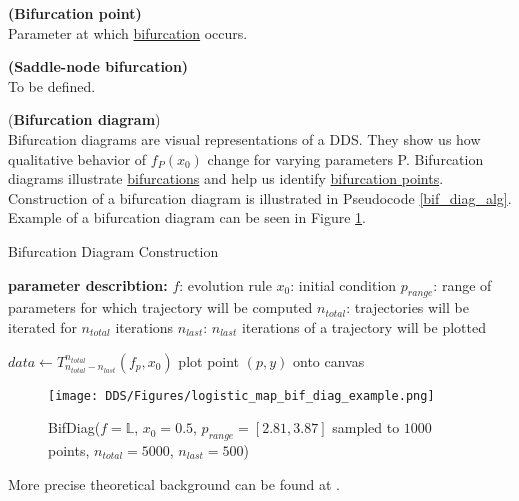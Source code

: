 \begin{definition} \textbf{(Bifurcation point)} \\
    \label{def:bifurcation_point}
    Parameter at which \hyperref[def:bifurcation]{bifurcation} occurs.
\end{definition}

\begin{definition} \textbf{(Saddle-node bifurcation)} \\
    \label{def:saddle_node_bif}
    To be defined.
\end{definition}


\begin{remark} (\textbf{Bifurcation diagram}) \label{def: bif_diag} \\
    Bifurcation diagrams are visual representations of a DDS.
    They show us how qualitative behavior of $f_P(x_0)$ change for varying parameters P.
    Bifurcation diagrams illustrate \hyperref[def:bifurcation]{bifurcations} and help us identify \hyperref[def:bifurcation_point]{bifurcation points}.
    Construction of a bifurcation diagram is illustrated in Pseudocode \ref{bif_diag_alg}.
    Example of a bifurcation diagram can be seen in Figure \ref{fig:bif_diag_example}.
\end{remark}

\begin{algorithm}
\caption{Bifurcation Diagram Construction}\label{bif_diag_alg}
\begin{algorithmic}[1]
\Statex \textbf{parameter describtion:}
\Statex $f$: evolution rule
\Statex $x_0$: initial condition
\Statex $p_{range}$: range of parameters for which trajectory will be computed
\Statex $n_{total}$: trajectories will be iterated for $n_{total}$ iterations
\Statex $n_{last}$: $n_{last}$ iterations of a trajectory will be plotted
\Statex

    \State $data \leftarrow T_{n_{total}-n_{last}}^{n_{total}}(f_p, x_0)$
        \State plot point $(p, y)$ onto canvas
    \EndFor
\EndFor
\EndFunction

\end{algorithmic}
\end{algorithm}

\begin{figure}[!h]
    \centering
    \texttt{[image: DDS/Figures/logistic\_map\_bif\_diag\_example.png]}
    \caption{BifDiag($f = \mathbb{L}$, $x_0 = 0.5$, $p_{range} = [2.81,3.87]$ sampled to $1000$ points, $n_{total} = 5000$, $n_{last} = 500$)}
    \label{fig:bif_diag_example}
\end{figure}

More precise theoretical background can be found at \cite{Devaney20211026,Elaskar2017,Lynch2014}.

\endinput